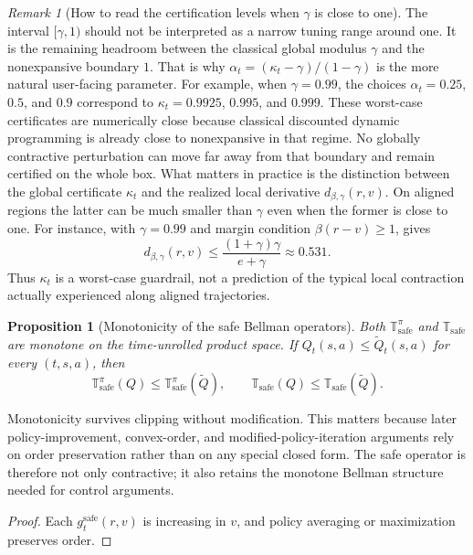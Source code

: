 \documentclass{article}
\newtheorem{proposition}[proposition]{Proposition}
\theoremstyle{remark}
\newtheorem{remark}[remark]{Remark}
\newcommand{\safe}{\mathrm{safe}}
\begin{document}
\begin{remark}[How to read the certification levels when $\gamma$ is close to one]
\label{rem:kappa-headroom}
The interval $[\gamma,1)$ should not be interpreted as a narrow tuning range around one.
It is the remaining headroom between the classical global modulus $\gamma$ and the nonexpansive boundary $1$.
That is why $\alpha_t=(\kappa_t-\gamma)/(1-\gamma)$ is the more natural user-facing parameter.
For example, when $\gamma=0.99$, the choices $\alpha_t=0.25$, $0.5$, and $0.9$ correspond to $\kappa_t=0.9925$, $0.995$, and $0.999$.
These worst-case certificates are numerically close because classical discounted dynamic programming is already close to nonexpansive in that regime.
No globally contractive perturbation can move far away from that boundary and remain certified on the whole box.
What matters in practice is the distinction between the global certificate $\kappa_t$ and the realized local derivative $d_{\beta,\gamma}(r,v)$.
On aligned regions the latter can be much smaller than $\gamma$ even when the former is close to one.
For instance, with $\gamma=0.99$ and margin condition $\beta(r-v)\ge 1$,  gives
\[
 d_{\beta,\gamma}(r,v)\le \frac{(1+\gamma)\gamma}{e+\gamma}\approx 0.531.
\]
Thus $\kappa_t$ is a worst-case guardrail, not a prediction of the typical local contraction actually experienced along aligned trajectories.
\end{remark}

\begin{proposition}[Monotonicity of the safe Bellman operators]
\label{prop:monotonicity}
Both $\mathbb T_\safe^\pi$ and $\mathbb T_\safe$ are monotone on the time-unrolled product space.
If $Q_t(s,a)\le \widetilde Q_t(s,a)$ for every $(t,s,a)$, then
\[
\mathbb T_\safe^\pi(Q)\le \mathbb T_\safe^\pi(\widetilde Q),
\qquad
\mathbb T_\safe(Q)\le \mathbb T_\safe(\widetilde Q).
\]
\end{proposition}

Monotonicity survives clipping without modification.
This matters because later policy-improvement, convex-order, and modified-policy-iteration arguments rely on order preservation rather than on any special closed form.
The safe operator is therefore not only contractive; it also retains the monotone Bellman structure needed for control arguments.

\begin{proof}
Each $g_t^{\safe}(r,v)$ is increasing in $v$, and policy averaging or maximization preserves order.
\end{proof}
\end{document}
